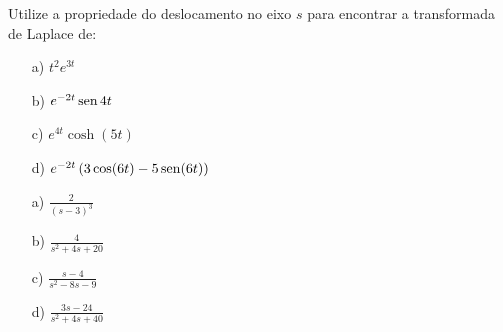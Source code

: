 \begin{exer}
Utilize a propriedade do deslocamento no eixo $s$ para encontrar a transformada de Laplace de:
\begin{itemize}
  \item[a)] $t^2 e^{3t}$
  \item[b)] $e^{-2t} \operatorname{sen} {4t}$
  \item[c)] $e^{4t} \cosh (5t)$
  \item[d)] $e^{-2t} \left( 3 \cos(6t) - 5 \operatorname{sen} (6t) \right)$
  \end{itemize}
\end{exer}

\begin{Answer}
\begin{itemize}
   \item[a)] $\displaystyle \frac{2}{(s-3)^3}$
  \item[b)] $\displaystyle \frac{4}{s^2 +4s +20}$
  \item[c)] $\displaystyle \frac{s-4}{s^2 - 8s - 9}$
  \item[d)] $\displaystyle \frac{3s -24}{s^2 +4s + 40}$
\end{itemize}
  \end{Answer}


